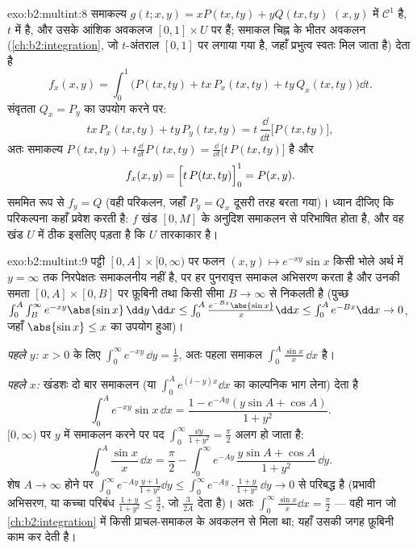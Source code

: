\begin{solution}{exo:b2:multint:8}
समाकल्य $g(t; x, y) = xP(tx, ty) + yQ(tx, ty)$ $(x, y)$ में $\mathcal{C}^1$ है, $t$ में  है, और उसके आंशिक अवकलज
$[0,1] \times U$ पर  हैं; समाकल चिह्न के भीतर अवकलन (\cref{ch:b2:integration}, जो 
$t$-अंतराल $[0,1]$ पर लगाया गया है, जहाँ प्रभुत्व स्वतः मिल जाता है)
देता है
\[
f_x(x, y)
= \int_0^1 \bigl(P(tx, ty) + tx\,P_x(tx, ty)
+ ty\,Q_x(tx, ty)\bigr)\dd t .
\]
संवृतता $Q_x = P_y$ का उपयोग करने पर:
\[
tx\,P_x(tx, ty) + ty\,P_y(tx, ty)
= t\,\frac{\dd}{\dd t}\bigl[P(tx, ty)\bigr] ,
\]
अतः समाकल्य $P(tx, ty) + t\frac{\dd}{\dd t}P(tx, ty) =
\frac{\dd}{\dd t}\bigl[t\,P(tx, ty)\bigr]$ है और
\[
f_x(x, y) = \Bigl[t\,P(tx, ty)\Bigr]_0^1 = P(x, y) .
\]
सममित रूप से $f_y = Q$ (वही परिकलन, जहाँ $P_y = Q_x$ दूसरी तरह बरता गया)।
ध्यान दीजिए कि परिकल्पना कहाँ प्रवेश करती है: $f$ खंड $[0, M]$ के
अनुदिश समाकलन से परिभाषित होता है, और वह खंड $U$ में ठीक इसलिए
पड़ता है कि $U$ तारकाकार है।
\end{solution}

\begin{solution}{exo:b2:multint:9}
पट्टी $[0, A] \times [0, \infty)$ पर फलन $(x, y)
\mapsto e^{-xy}\sin x$ किसी भोले अर्थ में $y =
\infty$ तक 
निरपेक्षतः समाकलनीय नहीं है, पर हर पुनरावृत्त समाकल अभिसरण करता
है और उनकी समता $[0, A]
\times [0, B]$ पर फ़ूबिनी तथा किसी सीमा $B \to \infty$ से निकलती है
(पुच्छ $\int_0^A\int_B^\infty e^{-xy}\abs{\sin x}\,\dd y\,\dd x \leq
\int_0^A \frac{e^{-Bx}\abs{\sin x}}{x}\dd x \leq \int_0^A e^{-Bx}
\dd x\to 0$, जहाँ $\abs{\sin x} \leq x$ का उपयोग हुआ)।

\emph{पहले $y$:} $x
> 0$ के लिए $\int_0^\infty e^{-xy}\,\dd y = \frac1x$, अतः पहला समाकल $\int_0^A \frac{\sin x}{x}\,\dd x$ है।

\emph{पहले $x$:} खंडशः दो बार समाकलन (या $\int_0^A e^{(i - y)x}\dd x$ का काल्पनिक भाग लेना)
देता है
\[
\int_0^A e^{-xy}\sin x\,\dd x
= \frac{1 - e^{-Ay}(y\sin A + \cos A)}{1 + y^2} .
\]
$[0, \infty)$ पर $y$ में समाकलन करने पर पद $\int_0^\infty
\frac{\dd y}{1 + y^2} = \frac\pi2$ अलग हो जाता है:
\[
\int_0^A \frac{\sin x}{x}\,\dd x
= \frac{\pi}{2}
- \int_0^\infty e^{-Ay}\,\frac{y\sin A + \cos A}{1 + y^2}\,\dd y .
\]
शेष $A \to \infty$ होने पर $\int_0^\infty e^{-Ay}\frac{y +
1}{1 + y^2}\dd y \leq \int_0^\infty e^{-Ay}\cdot\frac{1+y}{1+y^2}
\,\dd y \to 0$ से परिबद्ध है (प्रभावी अभिसरण, या कच्चा
परिबंध $\frac{1 + y}{1 + y^2} \leq \frac32$, जो $\frac{3}{2A}$ देता है)। अतः $\int_0^\infty\frac{\sin x}{x}\dd x =
\frac\pi2$ --- वही मान जो \cref{ch:b2:integration} में
किसी प्राचल-समाकल के अवकलन से मिला था; यहाँ उसकी जगह फ़ूबिनी काम कर
देती है।
\end{solution}

